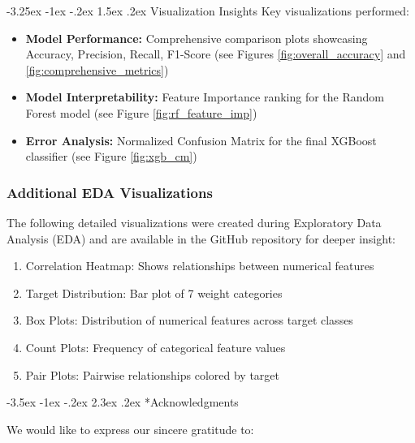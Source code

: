 \documentclass[12pt,a4paper]{article}
\makeatletter
\renewcommand{\section}{\@startsection{section}{1}{\z@}%
                                   {-3.5ex \@plus -1ex \@minus -.2ex}%
                                   {2.3ex \@plus .2ex}%
                                   {\normalfont\Large\bfseries\vspace{0.5\baselineskip}}}
\renewcommand{\subsection}{\@startsection{subsection}{2}{\z@}%
                                   {-3.25ex \@plus -1ex \@minus -.2ex}%
                                   {1.5ex \@plus .2ex}%
                                   {\normalfont\large\bfseries\vspace{0.3\baselineskip}}}
\makeatother
\begin{document}
\subsection{Visualization Insights}
Key visualizations performed:
\begin{itemize}
    \item \textbf{Model Performance:} Comprehensive comparison plots showcasing Accuracy, Precision, Recall, F1-Score (see Figures \ref{fig:overall_accuracy} and \ref{fig:comprehensive_metrics})
    \item \textbf{Model Interpretability:} Feature Importance ranking for the Random Forest model (see Figure \ref{fig:rf_feature_imp})
    \item \textbf{Error Analysis:} Normalized Confusion Matrix for the final XGBoost classifier (see Figure \ref{fig:xgb_cm})
\end{itemize}

\subsubsection{Additional EDA Visualizations}
The following detailed visualizations were created during Exploratory Data Analysis (EDA) and are available in the GitHub repository for deeper insight:
\begin{enumerate}
    \item Correlation Heatmap: Shows relationships between numerical features
    \item Target Distribution: Bar plot of 7 weight categories
    \item Box Plots: Distribution of numerical features across target classes
    \item Count Plots: Frequency of categorical feature values
    \item Pair Plots: Pairwise relationships colored by target
\end{enumerate}

\newpage

\section*{Acknowledgments}

We would like to express our sincere gratitude to:
\end{document}
